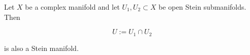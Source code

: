 Let $X$ be a complex manifold and let $U_1, U_2 \subset X$ be open Stein submanifolds. Then

$$U := U_1 \cap U_2$$

is also a Stein manifold.
